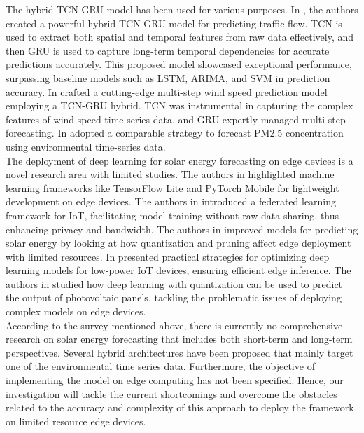\documentclass[sn-mathphys-num]{sn-jnl}%
\begin{document}
The hybrid TCN-GRU model has been used for various purposes. In \cite{hao2021hybrid}, the authors created a powerful hybrid TCN-GRU model for predicting traffic flow. TCN is used to extract both spatial and temporal features from raw data effectively, and then GRU is used to capture long-term temporal dependencies for accurate predictions accurately. This proposed model showcased exceptional performance, surpassing baseline models such as LSTM, ARIMA, and SVM in prediction accuracy. In \cite{li2021multi} crafted a cutting-edge multi-step wind speed prediction model employing a TCN-GRU hybrid. TCN was instrumental in capturing the complex features of wind speed time-series data, and GRU expertly managed multi-step forecasting. In \cite{zhu2021hybrid} adopted a comparable strategy to forecast PM2.5 concentration using environmental time-series data.\\ 
The deployment of deep learning for solar energy forecasting on edge devices is a novel research area with limited studies. The authors in \cite{Kumar2018} highlighted machine learning frameworks like TensorFlow Lite and PyTorch Mobile for lightweight development on edge devices. The authors in \cite{Chen2020} introduced a federated learning framework for IoT, facilitating model training without raw data sharing, thus enhancing privacy and bandwidth. The authors in \cite{GruossoGajani2022} improved models for predicting solar energy by looking at how quantization and pruning affect edge deployment with limited resources. In \cite{Li2021} presented practical strategies for optimizing deep learning models for low-power IoT devices, ensuring efficient edge inference. The authors in \cite{Tran2022} studied how deep learning with quantization can be used to predict the output of photovoltaic panels, tackling the problematic issues of deploying complex models on edge devices.\\ 
According to the survey mentioned above, there is currently no comprehensive research on solar energy forecasting that includes both short-term and long-term perspectives. Several hybrid architectures have been proposed that mainly target one of the environmental time series data. Furthermore, the objective of implementing the model on edge computing has not been specified. Hence, our investigation will tackle the current shortcomings and overcome the obstacles related to the accuracy and complexity of this approach to deploy the framework on limited resource edge devices.
\end{document}
